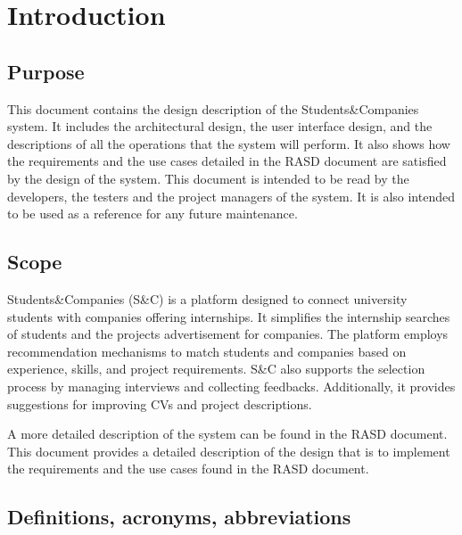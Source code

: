 \chapter{Introduction}

\section{Purpose}

This document contains the design description of the Students\&Companies system.
It includes the architectural design, the user interface design, and the descriptions of all the operations that the system will perform.
It also shows how the requirements and the use cases detailed in the RASD document are satisfied by the design of the system.
This document is intended to be read by the developers, the testers and the project managers of the system.
It is also intended to be used as a reference for any future maintenance.

\section{Scope}

Students\&Companies (S\&C) is a platform designed to connect university students with companies offering internships.
It simplifies the internship searches of students and the projects advertisement for companies.
The platform employs recommendation mechanisms to match students and companies based on experience, skills, and project requirements.
S\&C also supports the selection process by managing interviews and collecting feedbacks.
Additionally, it provides suggestions for improving CVs and project descriptions.

A more detailed description of the system can be found in the RASD document.
This document provides a detailed description of the design that is to implement the requirements and the use cases found in the RASD document.

\section{Definitions, acronyms, abbreviations}

